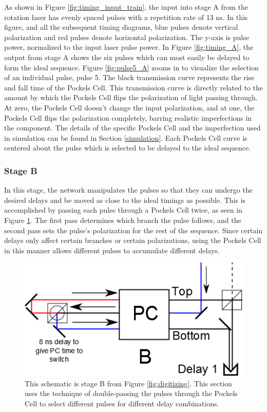 \documentclass[pdftex,12pt,a4paper]{article}
\begin{document}
 As shown in Figure \ref{fig:timing_input_train}, the input into stage A from the rotation laser has evenly spaced pulses with a repetition rate of 13 ns. In this figure, and all the subsequent timing diagrams, blue pulses denote vertical polarization and red pulses denote horizontal polarization. The y-axis is pulse power, normalized to the input laser pulse power. In Figure \ref{fig:timing_A}, the output from stage A shows the six pulses which can most easily be delayed to form the ideal sequence. Figure \ref{fig:pulse5_A} zooms in to visualize the selection of an individual pulse, pulse 5. The black transmission curve represents the rise and fall time of the Pockels Cell. This transmission curve is directly related to the amount by which the Pockels Cell flips the polarization of light passing through. At zero, the Pockels Cell doesn't change the input polarization, and at one, the Pockels Cell flips the polarization completely, barring realistic imperfections in the component. The details of the specific Pockels Cell and the imperfection used in simulation can be found in Section \ref{simulation}. Each Pockels Cell curve is centered about the pulse which is selected to be delayed to the ideal sequence. 

\subsubsection*{Stage B}
In this stage, the network manipulates the pulses so that they can undergo the desired delays and be moved as close to the ideal timings as possible. This is accomplished by passing each pulse through a Pockels Cell twice, as seen in Figure \ref{fig:stageB}. The first pass determines which branch the pulse follows, and the second pass sets the pulse's polarization for the rest of the sequence. Since certain delays only affect certain branches or certain polarizations, using the Pockels Cell in this manner allows different pulses to accumulate different delays. 


\begin{figure}[H]
\centering
\includegraphics[scale=0.6]{stageB.png} 
\caption{This schematic is stage B from Figure \ref{fig:digitizing}. This section uses the technique of double-passing the pulses through the Pockels Cell to select different pulses for different delay combinations.}
\label{fig:stageB}
\end{figure}
\end{document}
